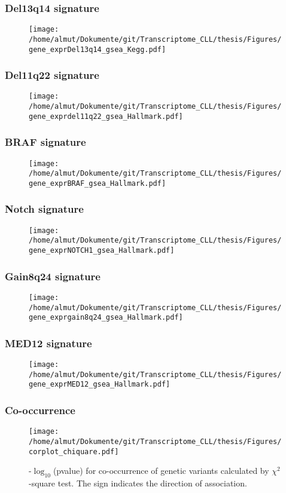 \documentclass[xcolor=dvipsnames,t,10pt]{beamer}
\begin{document}
%
%
\begin{frame}[c]
	\frametitle{Del13q14 signature}
	\begin{figure}
		\centering
		\texttt{[image: /home/almut/Dokumente/git/Transcriptome\_CLL/thesis/Figures/gene\_exprDel13q14\_gsea\_Kegg.pdf]}
	\end{figure}
\end{frame}
%
%
\begin{frame}[c]
	\frametitle{Del11q22 signature}
	\begin{figure}
		\centering
		\texttt{[image: /home/almut/Dokumente/git/Transcriptome\_CLL/thesis/Figures/gene\_exprdel11q22\_gsea\_Hallmark.pdf]}
	\end{figure}
\end{frame}
%
% 
\begin{frame}[c]
	\frametitle{BRAF signature}
	\begin{figure}
		\centering
		\texttt{[image: /home/almut/Dokumente/git/Transcriptome\_CLL/thesis/Figures/gene\_exprBRAF\_gsea\_Hallmark.pdf]}
	\end{figure}
\end{frame}
%
% 
\begin{frame}[c]
	\frametitle{Notch signature}
	\begin{figure}
		\centering
		\texttt{[image: /home/almut/Dokumente/git/Transcriptome\_CLL/thesis/Figures/gene\_exprNOTCH1\_gsea\_Hallmark.pdf]}
	\end{figure}
\end{frame}
%
% 
\begin{frame}[c]
	\frametitle{Gain8q24 signature}
	\begin{figure}
		\centering
		\texttt{[image: /home/almut/Dokumente/git/Transcriptome\_CLL/thesis/Figures/gene\_exprgain8q24\_gsea\_Hallmark.pdf]}
	\end{figure}
\end{frame}
%
% 
\begin{frame}[c]
	\frametitle{MED12 signature}
	\begin{figure}
		\centering
		\texttt{[image: /home/almut/Dokumente/git/Transcriptome\_CLL/thesis/Figures/gene\_exprMED12\_gsea\_Hallmark.pdf]}
	\end{figure}
\end{frame}
%
%
\begin{frame}[c]
	\frametitle{Co-occurrence}
	\begin{figure}
		\centering
		\texttt{[image: /home/almut/Dokumente/git/Transcriptome\_CLL/thesis/Figures/corplot\_chiquare.pdf]}
		\caption{-$\log_{10}$(pvalue) for co-occurrence of genetic variants calculated by $\chi^2$-square test. The sign indicates the direction of association.}
	\end{figure}
\end{frame}
%
%
\end{document}
